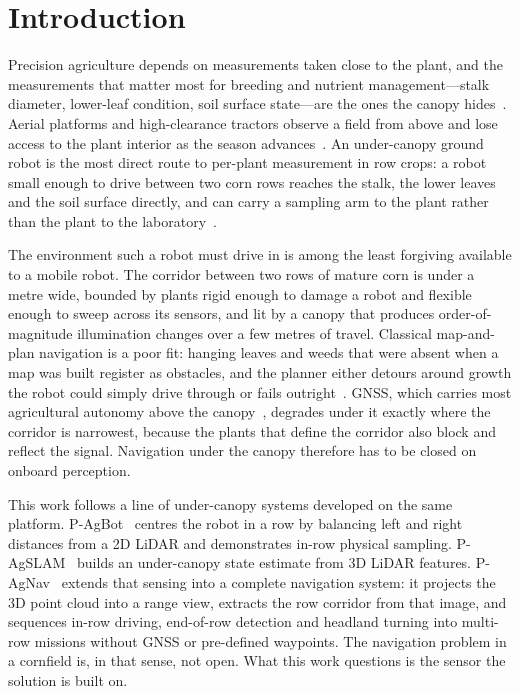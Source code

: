 \documentclass[conference]{IEEEtran}
\begin{document}
\section{Introduction}
Precision agriculture depends on measurements taken close to the plant, and the
measurements that matter most for breeding and nutrient management---stalk
diameter, lower-leaf condition, soil surface state---are the ones the canopy
hides~\cite{ref07,ref08}. Aerial platforms and high-clearance tractors observe a
field from above and lose access to the plant interior as the season
advances~\cite{ref09}. An under-canopy ground robot is the most direct route to
per-plant measurement in row crops: a robot small enough to drive between two
corn rows reaches the stalk, the lower leaves and the soil surface directly, and
can carry a sampling arm to the plant rather than the plant to the
laboratory~\cite{kim2022pagbot,ref18}.

The environment such a robot must drive in is among the least forgiving
available to a mobile robot. The corridor between two rows of mature corn is
under a metre wide, bounded by plants rigid enough to damage a robot and
flexible enough to sweep across its sensors, and lit by a canopy that produces
order-of-magnitude illumination changes over a few metres of travel. Classical
map-and-plan navigation is a poor fit: hanging leaves and weeds that were absent
when a map was built register as obstacles, and the planner either detours
around growth the robot could simply drive through or fails
outright~\cite{ref12}. GNSS, which carries most agricultural autonomy above the
canopy~\cite{ref10,ref11}, degrades under it exactly where the corridor is
narrowest, because the plants that define the corridor also block and reflect
the signal. Navigation under the canopy therefore has to be closed on onboard
perception.

This work follows a line of under-canopy systems developed on the same platform.
P-AgBot~\cite{kim2022pagbot} centres the robot in a row by balancing left and
right distances from a 2D LiDAR and demonstrates in-row physical sampling.
P-AgSLAM~\cite{kim2024pagslam} builds an under-canopy state estimate from 3D
LiDAR features. P-AgNav~\cite{kim2025pagnav} extends that sensing into a
complete navigation system: it projects the 3D point cloud into a range view,
extracts the row corridor from that image, and sequences in-row driving,
end-of-row detection and headland turning into multi-row missions without GNSS
or pre-defined waypoints. The navigation problem in a cornfield is, in that
sense, not open. What this work questions is the sensor the solution is built
on.
\end{document}
